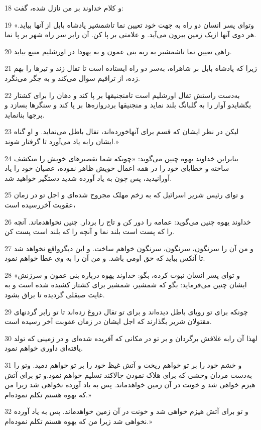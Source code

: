 \par 18 و کلام خداوند بر من نازل شده، گفت:
\par 19 «وتو‌ای پسر انسان دو راه به جهت خود تعیین نما تاشمشیر پادشاه بابل از آنها بیاید. هر دوی آنها ازیک زمین بیرون می‌آید. و علامتی بر پا کن. آن رابر سر راه شهر بر پا نما.
\par 20 راهی تعیین نما تاشمشیر به ربه بنی عمون و به یهودا در اورشلیم منیع بیاید.
\par 21 زیرا که پادشاه بابل بر شاهراه، به‌سر دو راه ایستاده است تا تفال زند و تیرها را بهم زده، از ترافیم سوال می‌کند و به جگر می‌نگرد.
\par 22 به‌دست راستش تفال اورشلیم است تامنجنیقها بر پا کند و دهان را برای کشتار بگشایدو آواز را به گلبانگ بلند نماید و منجنیقها بردروازه‌ها بر پا کند و سنگرها بسازد و برجها بنانماید.
\par 23 لیکن در نظر ایشان که قسم برای آنهاخورده‌اند، تفال باطل می‌نماید. و او گناه ایشان رابه یاد می‌آورد تا گرفتار شوند.»
\par 24 بنابراین خداوند یهوه چنین می‌گوید: «چونکه شما تقصیرهای خویش را منکشف ساخته و خطایای خود را در همه اعمال خویش ظاهر نموده، عصیان خود را یاد آورانیدید، پس چون به یاد آورده شدید دستگیر خواهید شد.
\par 25 و تو‌ای رئیس شریر اسرائیل که به زخم مهلک مجروح شده‌ای و اجل تو در زمان عقوبت آخررسیده است،
\par 26 خداوند یهوه چنین می‌گوید: عمامه را دور کن و تاج را بردار. چنین نخواهدماند. آنچه را که پست است بلند نما و آنچه را که بلند است پست کن.
\par 27 و من آن را سرنگون، سرنگون، سرنگون خواهم ساخت. و این دیگرواقع نخواهد شد تا آنکس بیاید که حق اومی باشد. و من آن را به وی عطا خواهم نمود.
\par 28 «و تو‌ای پسر انسان نبوت کرده، بگو: خداوند یهوه درباره بنی عمون و سرزنش ایشان چنین می‌فرماید: بگو که شمشیر، شمشیر برای کشتار کشیده شده است و به غایت صیقلی گردیده تا براق بشود.
\par 29 چونکه برای تو رویای باطل دیده‌اند و برای تو تفال دروغ زده‌اند تا تو رابر گردنهای مقتولان شریر بگذارند که اجل ایشان در زمان عقوبت آخر رسیده است.
\par 30 لهذا آن رابه غلافش برگردان و بر تو در مکانی که آفریده شده‌ای و در زمینی که تولد یافته‌ای داوری خواهم نمود.
\par 31 و خشم خود را بر تو خواهم ریخت و آتش غیظ خود را بر تو خواهم دمید. وتو را به‌دست مردان وحشی که برای هلاک نمودن چالاکند تسلیم خواهم نمود.و تو برای آتش هیزم خواهی شد و خونت در آن زمین خواهدماند. پس به یاد آورده نخواهی شد زیرا من که یهوه هستم تکلم نموده‌ام.»
\par 32 و تو برای آتش هیزم خواهی شد و خونت در آن زمین خواهدماند. پس به یاد آورده نخواهی شد زیرا من که یهوه هستم تکلم نموده‌ام.»

